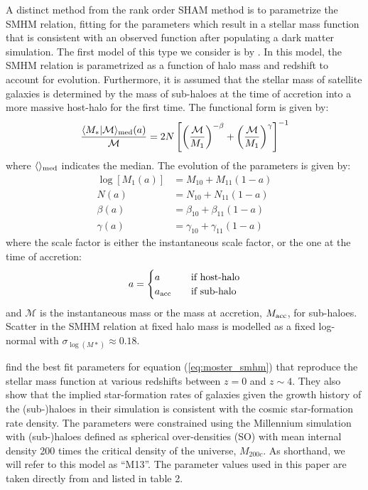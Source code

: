 \documentclass[useAMS,fleqn,usenatbib]{mnras}
\begin{document}
A distinct method from the rank order SHAM method is to parametrize the SMHM relation, fitting for the parameters which result in a stellar mass function that is consistent with an observed function after populating a dark matter simulation.  The first model of this type we consider is by \cite{Moster:2013ab}. In this model, the SMHM relation is parametrized as a function of halo mass and redshift to account for evolution.  Furthermore, it is assumed that the stellar mass of satellite galaxies is determined by the mass of sub-haloes at the time of accretion into a more massive host-halo for the first time.  The functional form is given by:
%
\begin{equation}
\label{eq:moster_smhm}
\frac{\langle M_{*} | \mathcal{M}\rangle_{\rm med}(a)}{\mathcal{M}} = 2N\left[ \left(\frac{\mathcal{M}}{{M}_1} \right)^{-\beta} + \left( \frac{\mathcal{M}}{{M}_1} \right)^{\gamma} \right]^{-1}
\end{equation}
%
where $\langle\rangle_{\rm med}$ indicates the median.  The evolution of the parameters is given by:
%
\begin{align}
\label{eq:smhm_params}
\log[{M}_1(a)]& = {M}_{10} + {M}_{11}(1-a) \\
N(a) &= N_{10} + N_{11}(1-a) \\
\beta(a) &= \beta_{10} + \beta_{11}(1-a) \\ 
\gamma(a) &=  \gamma_{10} + \gamma_{11}(1-a)
\end{align}
%
where the scale factor is either the instantaneous scale factor, or the one at the time of accretion:
%
\begin{equation}
a = 
\begin{cases}
    a      & \quad \text{if host-halo}\\
    a_{\rm acc}  & \quad \text{if sub-halo} \\
  \end{cases}
\end{equation}
%
and $\mathcal{M}$ is the instantaneous mass or the mass at accretion, $M_{\rm acc}$, for sub-haloes.  Scatter in the SMHM relation at fixed halo mass is modelled as a fixed log-normal with $\sigma_{\log(M*)} \approx 0.18$.

\citet{Moster:2013ab} find the best fit parameters for equation (\ref{eq:moster_smhm}) that reproduce the stellar mass function at various redshifts between $z=0$ and $z \sim 4$.  They also show that the implied star-formation rates of galaxies given the growth history of the (sub-)haloes in their simulation is consistent with the cosmic star-formation rate density.  The parameters were constrained using the Millennium simulation with (sub-)haloes defined as spherical over-densities (SO) with mean internal density 200 times the critical density of the universe, $M_{200c}$.   As shorthand, we will refer to this model as ``M13''.  The parameter values used in this paper are taken directly from \citet{Moster:2013ab} and listed in table 2.
      
\end{document}
